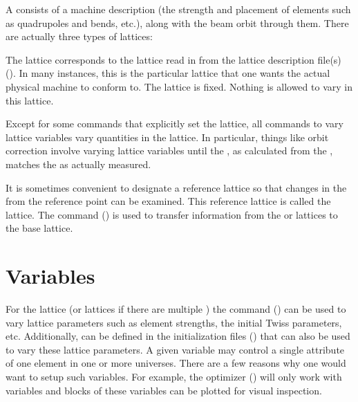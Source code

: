 A  consists of a machine description (the strength and
placement of elements such as quadrupoles and bends, etc.), along with the
beam orbit through them. There are actually three types of lattices:
  \vspace*{-3ex}
  \begin{description}
  \item[Design Lattice] \Newline 
The  lattice corresponds to the lattice read in from the
lattice description file(s) (). In many instances, this
is the particular lattice that one wants the actual physical machine
to conform to. The  lattice is fixed. Nothing is allowed to
vary in this lattice.
  \item[Model Lattice] \Newline
Except for some commands that explicitly set the  lattice,
all \tao commands to vary lattice variables vary quantities in the
 lattice. In particular, things like orbit correction
involve varying  lattice variables until the ,
as calculated from the , matches the  as actually measured.
  \item[Base Lattice] \Newline
It is sometimes convenient to designate a reference lattice so that
changes in the  from the reference point can be examined.
This reference lattice is called the  lattice. The 
command () is used to transfer information from the
 or  lattices to the base lattice.
  \end{description}

\section{Variables}
\label{s:var}

For the  lattice (or lattices if there are multiple
) the  command () can be used
to vary lattice parameters such as element strengths, the initial
Twiss parameters, etc.  Additionally,  can be defined
in the \tao initialization files ()
that can also be used to vary these  lattice parameters.  
A given \tao variable may control a single attribute of one element 
in one or more universes.  
There are a few reasons why one would want to setup such variables.
For example, the optimizer () will only work with
\tao variables and blocks of these variables can be plotted for visual
inspection.

